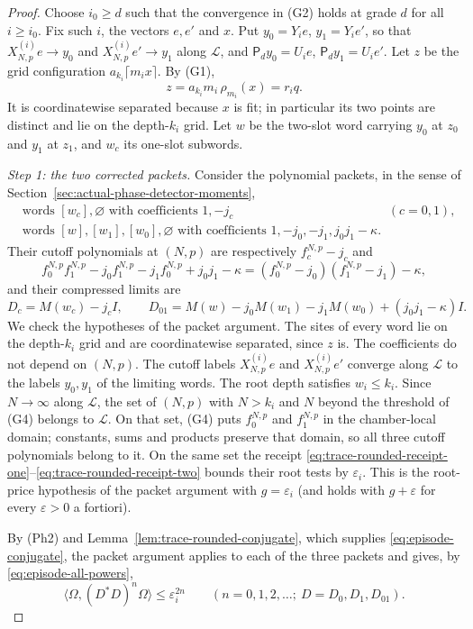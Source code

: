 \begin{proof}
Choose $i_0\ge d$ such that the convergence in (G2) holds at grade $d$
for all $i\ge i_0$. Fix such $i$, the vectors $e,e'$ and $x$. Put
$y_0=Y_ie$, $y_1=Y_ie'$, so that
$X^{(i)}_{N,p}e\to y_0$ and $X^{(i)}_{N,p}e'\to y_1$ along
$\mathcal L$, and $\mathsf P_dy_0=U_ie$, $\mathsf P_dy_1=U_ie'$. Let $z$
be the grid configuration $a_{k_i}\lceil m_ix\rceil$. By (G1),
\[
 z=a_{k_i}m_i\,\rho_{m_i}(x)=r_iq .
\]
It is coordinatewise separated because $x$ is fit; in particular its
two points are distinct and lie on the depth-$k_i$ grid. Let $w$ be the
two-slot word carrying $y_0$ at $z_0$ and $y_1$ at $z_1$, and $w_c$ its
one-slot subwords.

\emph{Step 1: the two corrected packets.} Consider the polynomial
packets, in the sense of
Section~\ref{sec:actual-phase-detector-moments},
\begin{align*}
 &\text{words }[w_c],\varnothing\text{ with coefficients }1,-j_c
 &&(c=0,1),\\
 &\text{words }[w],[w_1],[w_0],\varnothing\text{ with coefficients }
 1,-j_0,-j_1,j_0j_1-\kappa .
\end{align*}
Their cutoff polynomials at $(N,p)$ are respectively $f_c^{N,p}-j_c$ and
\[
 f_0^{N,p}f_1^{N,p}-j_0f_1^{N,p}-j_1f_0^{N,p}+j_0j_1-\kappa
 =(f_0^{N,p}-j_0)(f_1^{N,p}-j_1)-\kappa ,
\]
and their compressed limits are
\[
 D_c=M(w_c)-j_cI,\qquad D_{01}=M(w)-j_0M(w_1)-j_1M(w_0)+(j_0j_1-\kappa)I .
\]
We check the hypotheses of the packet argument. The sites of every word
lie on the depth-$k_i$ grid and are coordinatewise separated, since $z$
is. The coefficients do not depend on $(N,p)$. The cutoff labels
$X^{(i)}_{N,p}e$ and $X^{(i)}_{N,p}e'$ converge along $\mathcal L$ to the
labels $y_0,y_1$ of the limiting words. The root depth satisfies
$w_i\le k_i$. Since $N\to\infty$ along $\mathcal L$, the set of $(N,p)$
with $N>k_i$ and $N$ beyond the threshold of (G4) belongs to
$\mathcal L$. On that set, (G4) puts $f_0^{N,p}$ and $f_1^{N,p}$ in the
chamber-local domain; constants, sums and products preserve that domain,
so all three cutoff polynomials belong to it. On the same set the receipt
\eqref{eq:trace-rounded-receipt-one}--\eqref{eq:trace-rounded-receipt-two}
bounds their root tests by $\varepsilon_i$. This is the root-price
hypothesis of the packet argument with $g=\varepsilon_i$ (and holds with
$g+\varepsilon$ for every $\varepsilon>0$ a fortiori).

By (Ph2) and Lemma~\ref{lem:trace-rounded-conjugate}, which supplies
\eqref{eq:episode-conjugate}, the packet argument applies to each of the
three packets and gives, by \eqref{eq:episode-all-powers},
\[
 \langle\Omega,(D^*D)^n\Omega\rangle\le\varepsilon_i^{2n}
 \qquad(n=0,1,2,\ldots;\ D=D_0,D_1,D_{01}).
\]


\end{proof}
